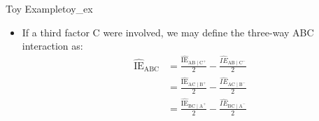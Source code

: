 \begin{Example}{Toy Example}{toy_ex}
\begin{itemize}
\begin{align*}
                   & =-1
              \end{align*}
        \item If a third factor C were involved, we may define the three-way ABC interaction as:
              \begin{align*}
                  \widehat{\text{IE}}_{\text{ABC}}
                   & =\frac{\widehat{\text{IE}}_{\text{AB}\mid\text{C}^+}}{2}-\frac{\widehat{IE}_{\text{AB}\mid\text{C}^-}}{2} \\
                   & =\frac{\widehat{\text{IE}}_{\text{AC}\mid\text{B}^+}}{2}-\frac{\widehat{IE}_{\text{AC}\mid\text{B}^-}}{2} \\
                   & =\frac{\widehat{\text{IE}}_{\text{BC}\mid\text{A}^+}}{2}-\frac{\widehat{IE}_{\text{BC}\mid\text{A}^-}}{2}
              \end{align*}
    \end{itemize}
\end{Example}
